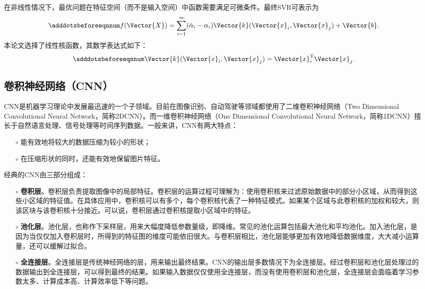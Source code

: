 在非线性情况下，最优问题在特征空间（而不是输入空间）中函数需要满足可微条件。最终SVR可表示为
\begin{equation}\adddotsbeforeeqnnum
  \label{eq:ml_svr_kernel_v2}
  f(\Vector{X})=\sum_{i=1}^{m}(\hat{\alpha}_i-\alpha_i)\Vector{k}(\Vector{x}_i,\Vector{x}_j)+\Vector{b}.
\end{equation}
本论文选择了线性核函数，其数学表达式如下：
\begin{equation}\adddotsbeforeeqnnum
  \label{eq:ml_svr_kernel_linear}
  \Vector{k}(\Vector{x}_i,\Vector{x}_j)=\Vector{x}_i^{\text{T}}\Vector{x}_j.
\end{equation}

\subsection{卷积神经网络（CNN）}\label{sec:ml_cnn}

CNN是机器学习理论中发展最迅速的一个子领域。目前在图像识别、自动驾驶等领域都使用了二维卷积神经网络（Two Dimensional Convolutional Neural Network，简称2DCNN）。而一维卷积神经网络（One Dimensional Convolutional Neural Network，简称1DCNN）擅长于自然语言处理、信号处理等时间序列数据。一般来讲，CNN有两大特点：
\begin{itemize}
  \item[$\circ$] 能有效地将较大的数据压缩为较小的形状；
  \item[$\circ$] 在压缩形状的同时，还能有效地保留图片特征。
\end{itemize}

经典的CNN由三部分组成：
\begin{itemize}
  \item[$\circ$] \textbf{卷积层}。卷积层负责提取图像中的局部特征。卷积层的运算过程可理解为：使用卷积核来过滤原始数据中的部分小区域，从而得到这些小区域的特征值。在具体应用中，卷积核可以有多个，每个卷积核代表了一种特征模式。如果某个区域与此卷积核的加权和较大，则该区块与该卷积核十分接近。可以说，卷积层通过卷积核提取小区域中的特征。
  \item[$\circ$] \textbf{池化层}。池化层，也称作下采样层，用来大幅度降低参数量级，即降维。常见的池化运算包括最大池化和平均池化。加入池化层，是因为当仅仅加入卷积层时，所得到的特征图的维度可能依旧很大。与卷积层相比，池化层能够更加有效地降低数据维度，大大减小运算量，还可以缓解过拟合。
  \item[$\circ$] \textbf{全连接层}。全连接层是传统神经网络的层，用来输出最终结果。CNN的输出层多数情况下为全连接层。经过卷积层和池化层处理过的数据输出到全连接层，可以得到最终的结果。如果输入数据仅仅使用全连接层，而没有使用卷积层和池化层，全连接层会面临着学习参数太多、计算成本高、计算效率低下等问题。
\end{itemize}

